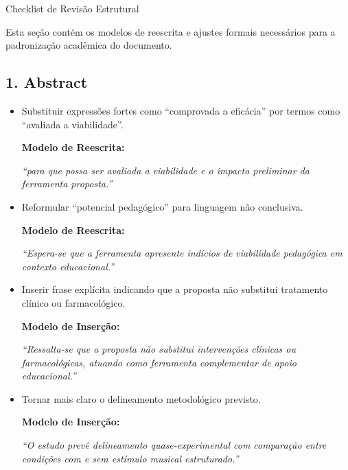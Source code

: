\documentclass[11pt,a4paper]{article}
\begin{document}
\printbibliography[title={Referências}]

\newpage

\begin{boxAvisos}{Checklist de Revisão Estrutural}
    \label{sec:checklist-revisao}
    
    Esta seção contém os modelos de reescrita e ajustes formais necessários para a padronização acadêmica do documento.

\subsection*{1. Abstract}

\begin{itemize}
    \item[$\boxtimes$] Substituir expressões fortes como ``comprovada a eficácia'' por termos como ``avaliada a viabilidade''.
    
    \textbf{Modelo de Reescrita:}
    
    \textit{``para que possa ser avaliada a viabilidade e o impacto preliminar da ferramenta proposta.''}

    \item[$\boxtimes$] Reformular ``potencial pedagógico'' para linguagem não conclusiva.
    
    \textbf{Modelo de Reescrita:}
    
    \textit{``Espera-se que a ferramenta apresente indícios de viabilidade pedagógica em contexto educacional.''}

    \item[$\boxtimes$] Inserir frase explícita indicando que a proposta não substitui tratamento clínico ou farmacológico.
    
    \textbf{Modelo de Inserção:}
    
    \textit{``Ressalta-se que a proposta não substitui intervenções clínicas ou farmacológicas, atuando como ferramenta complementar de apoio educacional.''}

    \item[$\boxtimes$] Tornar mais claro o delineamento metodológico previsto.
    
    \textbf{Modelo de Inserção:}
    
    \textit{``O estudo prevê delineamento quase-experimental com comparação entre condições com e sem estímulo musical estruturado.''}
\end{itemize}



\end{boxAvisos}
\end{document}
